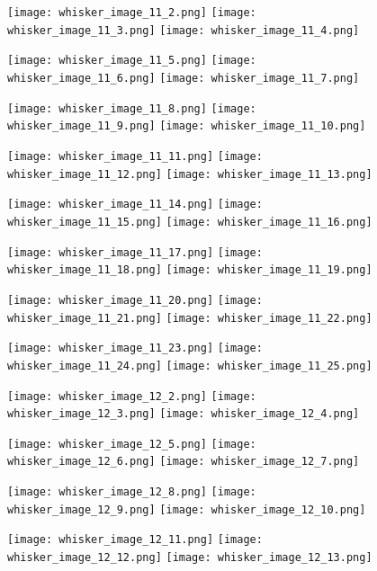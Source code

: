 \documentclass[12pt]{article}
\begin{document}
\begin{figure}
	\centerline{
		\texttt{[image: whisker\_image\_11\_2.png]}
		\texttt{[image: whisker\_image\_11\_3.png]}
		\texttt{[image: whisker\_image\_11\_4.png]}
	}
	\centerline{
		\texttt{[image: whisker\_image\_11\_5.png]}
		\texttt{[image: whisker\_image\_11\_6.png]}
		\texttt{[image: whisker\_image\_11\_7.png]}
	}
	\centerline{
		\texttt{[image: whisker\_image\_11\_8.png]}
		\texttt{[image: whisker\_image\_11\_9.png]}
		\texttt{[image: whisker\_image\_11\_10.png]}
	}
	\centerline{
		\texttt{[image: whisker\_image\_11\_11.png]}
		\texttt{[image: whisker\_image\_11\_12.png]}
		\texttt{[image: whisker\_image\_11\_13.png]}
	}
\end{figure}

\begin{figure}
	\centerline{
		\texttt{[image: whisker\_image\_11\_14.png]}
		\texttt{[image: whisker\_image\_11\_15.png]}
		\texttt{[image: whisker\_image\_11\_16.png]}
	}
	\centerline{
		\texttt{[image: whisker\_image\_11\_17.png]}
		\texttt{[image: whisker\_image\_11\_18.png]}
		\texttt{[image: whisker\_image\_11\_19.png]}
	}
	\centerline{
		\texttt{[image: whisker\_image\_11\_20.png]}
		\texttt{[image: whisker\_image\_11\_21.png]}
		\texttt{[image: whisker\_image\_11\_22.png]}
	}
	\centerline{
		\texttt{[image: whisker\_image\_11\_23.png]}
		\texttt{[image: whisker\_image\_11\_24.png]}
		\texttt{[image: whisker\_image\_11\_25.png]}
	}
\end{figure}

\begin{figure}
	\centerline{
		\texttt{[image: whisker\_image\_12\_2.png]}
		\texttt{[image: whisker\_image\_12\_3.png]}
		\texttt{[image: whisker\_image\_12\_4.png]}
	}
	\centerline{
		\texttt{[image: whisker\_image\_12\_5.png]}
		\texttt{[image: whisker\_image\_12\_6.png]}
		\texttt{[image: whisker\_image\_12\_7.png]}
	}
	\centerline{
		\texttt{[image: whisker\_image\_12\_8.png]}
		\texttt{[image: whisker\_image\_12\_9.png]}
		\texttt{[image: whisker\_image\_12\_10.png]}
	}
	\centerline{
		\texttt{[image: whisker\_image\_12\_11.png]}
		\texttt{[image: whisker\_image\_12\_12.png]}
		\texttt{[image: whisker\_image\_12\_13.png]}
	}
\end{figure}
\end{document}
